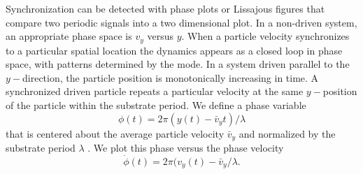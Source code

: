 \documentclass[twocolumn,preprintnumbers,amsmath,amssymb,aps,prx]{revtex4}
\begin{document}
  Synchronization 
  can be detected with 
  phase
  plots or Lissajous figures
  that 
  compare two periodic signals
  into a two dimensional plot.
  In a non-driven system, an appropriate
  phase space is $v_y$ versus $y$.  
  When a particle velocity
  synchronizes to a particular spatial location
  the dynamics
  appears as 
  a closed loop in  
  phase space, %
  with patterns determined by the mode. %
  In a system driven parallel to the $y-$direction,
  the particle position is monotonically increasing
  in time.
  A synchronized driven particle
  repeats a particular velocity
  at the same $y-$position of the particle
  within the substrate period.
  We define a phase variable 
  \begin{equation}
    \phi(t) = 2\pi(y(t)-\bar{v}_y t)/\lambda
  \end{equation}
  that is centered about the average particle velocity $\bar{v}_y$
  and normalized by the substrate period $\lambda$ \cite{Juniper2015}.
  We plot this phase
  versus the phase velocity 
  \begin{equation}
    \dot{\phi}(t) = 2\pi(v_y(t)-\bar{v}_y/\lambda.
  \end{equation}
  
\end{document}
